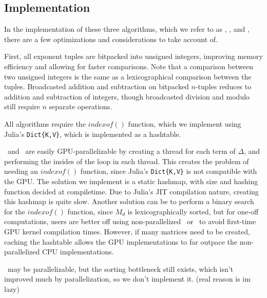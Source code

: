 \subsection{Implementation}
In the implementation of these three algorithms, which we refer to as \triv, \merge, and \wics, there are a few optimizations and considerations to take account of.

First, all exponent tuples are bitpacked into unsigned integers, improving memory efficiency and allowing for faster comparisons.
Note that a comparison between two unsigned integers is the same as a lexicographical comparison between the tuples.
Broadcasted addition and subtraction on bitpacked $n$-tuples reduces to addition and subtraction of integers, though broadcasted division and modulo still require $n$ separate operations.

All algorithms require the $indexof()$ function, which we implement using Julia's \texttt{Dict\{K,V\}}, which is implemented as a hashtable.

\triv ~and \wics ~are easily GPU-parallelizable by creating a thread for each term of $\Delta$, and performing the insides of the loop in each thread.
This creates the problem of needing an $indexof()$ function, since Julia's \texttt{Dict\{K,V\}} is not compatible with the GPU.
The solution we implement is a static hashmap, with size and hashing function decided at compiletime.
Due to Julia's JIT compilation nature, creating this hashmap is quite slow.
Another solution can be to perform a binary search for the $indexof()$ function, since $M_d$ is lexicographically sorted, but for one-off computations, users are better off using non-parallelized \merge ~or \wics ~to avoid first-time GPU kernel compilation times.
However, if many matrices need to be created, caching the hashtable allows the GPU implementations to far outpace the non-parallelized CPU implementations.

\merge ~may be parallelizable, but the sorting bottleneck still exists, which isn't improved much by parallelization, so we don't implement it. (real reason is im lazy)
